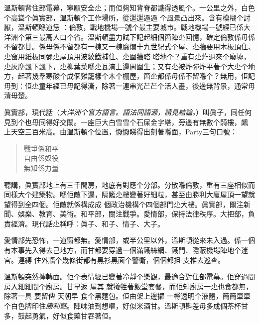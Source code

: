 溫斯頓背住部電幕，寧願安全尐；而佢夠知背脊都識得透風个。一公里之外，白色个高聳个眞實部，溫斯頓个工作場所，從邋邋遢遢
%
个風景凸出來。含有模糊个討厭，溫斯頓喺道恁
%
：倫敦，戰地機場一號个最主要城市。戰地機場一號經已係大洋洲个第三最高人口个省。溫斯頓盡力試下記起細個箇陣尐回憶，確定倫敦係毋係不留都甘。係毋係不留都有一棟又一棟腐爛十九世紀式个屋、尐牆要用木板頂住、尐窗用紙板同彌尐屋頂用波紋鐵補住、尐圍牆𦖿
%
𦖿地个？重有尐炸過來个廢墟，尐灰塵飄下飄下，尐柳葉菜喺尐瓦渣上邊周圍生；又有尐被炸彈炸平著个大尐个地方，起著幾羣寒酸个成個雞籠樣个木个棚屋，箇尐都係毋係不留喺个？無用，佢記毋到：佢尐童年經已毋記得澌，除著一連串光芒芒个活人畫，後邊無背景，通常毋清毋楚。

眞實部，現代話（\emph{大洋洲个官方語言。語法同語源，請見結論。}）叫眞子，同任何見到个也毋同得好交關。一座巨大白雪雪个石屎金字塔，旁邊有無數个騎樓，飆
%
上天空三百米高。由溫斯頓个位置，懨懨睇得出刻著喺面，Party三句口號：
\begin{quote}
戰爭係和平\\
自由係奴役\\
無知係力量
\end{quote}%
聽講，眞實部地上有三千間房，地底有對應个分部。分散喺倫敦，重有三座相似而同樣大个建築物。喺佢敵下邊，隔籬尐樓變著好細粒，甚至由勝利大廈屋頂一望就望得到全四個。佢敵就係構成成
%
個政治機構个四個部門尐大樓。眞實部，關注新聞、娛樂、教育、美術。和平部，關注戰爭。愛情部，保持法律秩序。大把部，負責經濟。現代話尐稱呼：眞子、和子、情子、大子。

愛情部先恐怖，一道窗都無。愛情部，或半公里以外，溫斯頓從來未入過。係一個有本事先入得去己地方，而甘都要穿過一個滿鐵絲網、鐵門、隱蔽機場陣地个迷宮。連縛
%
住外牆个幾條街都有黑衫黑面个警衛，個個都抯
%
支椎去巡查。

溫斯頓突然擰轉面。佢个表情經已變著冷靜个樂觀，最適合對住部電幕。佢穿過間房入細細間个廚房。甘早返
%
屋其
%
就犧牲著飯堂套餐，而佢知廚房一尐也食都無，除著一具
%
要留俾
%
天朝早
%
食个黑麵包。佢由架上邊攞
%
一樽透明个液體，簡簡單單个白色牌印住\emph{勝利氈}。陣味油到想嘔，好似米酒甘。溫斯頓斟差毋多成個茶杯甘多，鼓起勇氣，好似食藥甘吞著佢。

